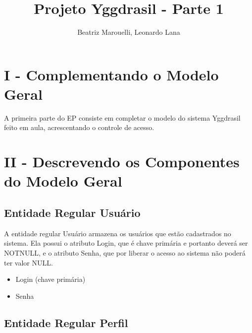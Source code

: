 \documentclass[a4paper]{article}
\title{Projeto Yggdrasil - Parte 1}
\author{Beatriz Marouelli, Leonardo Lana}
\begin{document}
\maketitle

\section*{I - Complementando o Modelo Geral}

A primeira parte do EP consiste em completar o modelo do sistema Yggdrasil feito em aula, acrescentando o controle de acesso.

\section*{II - Descrevendo os Componentes do Modelo Geral}

\subsection*{Entidade Regular Usuário}


A entidade regular Usuário armazena os usuários que estão cadastrados no sistema.
Ela possui o atributo Login, que é chave primária e portanto deverá ser NOTNULL,
e o atributo Senha, que por liberar o acesso ao sistema não poderá ter valor NULL.

\begin{itemize}
    \item Login (chave primária)
    \item Senha
\end{itemize}

\subsection*{Entidade Regular Perfil}

\end{document}
